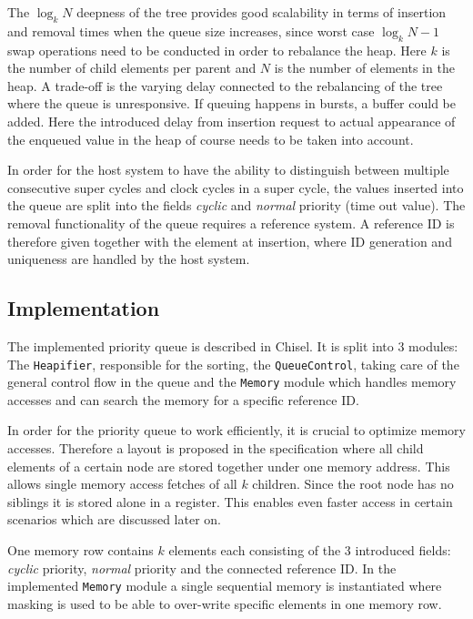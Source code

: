 \documentclass[runningheads]{llncs}
\begin{document}
The $\log_k N$ deepness of the tree provides good scalability in terms of insertion and removal times when the queue size increases, 
since worst case $\log_k N-1$ swap operations need to be conducted in order to rebalance the heap. Here $k$ is the number of child elements per parent and $N$
is the number of elements in the heap. A trade-off is the varying delay connected to the rebalancing of the tree where the queue is unresponsive. If queuing
happens in bursts, a buffer could be added. Here the introduced delay from insertion request to actual appearance of the enqueued value in the heap of course needs
to be taken into account.

In order for the host system to have the ability to distinguish between multiple consecutive super cycles and clock cycles in a super cycle, the values inserted 
into the queue are split into the fields \textit{cyclic} and \textit{normal} priority (time out value). The removal functionality of the queue requires a reference system. A reference 
ID is therefore given together with the element at insertion, where ID generation and uniqueness are handled by the host system.

\subsection{Implementation}

The implemented priority queue is described in Chisel.
It is split into 3 modules: The \texttt{Heapifier}, responsible for the sorting, the \texttt{QueueControl}, taking care
of the general control flow in the queue and the \texttt{Memory} module which handles memory accesses and can search the memory for a specific reference 
ID.

In order for the priority queue to work efficiently, it is crucial to optimize memory accesses. Therefore a layout is proposed in the specification where all 
child elements of a certain node are stored together under one memory address. This allows single memory access fetches of all $k$ children. Since 
the root node has no siblings it is stored alone in a register. This enables even faster access in certain scenarios which are discussed later on.

One memory row contains $k$ elements each consisting of the 3 introduced fields: \textit{cyclic} priority, \textit{normal} priority and the connected
reference ID. In the implemented 
\texttt{Memory} module a single sequential memory is instantiated where masking is used to be able to over-write specific elements in one memory row.
\end{document}

